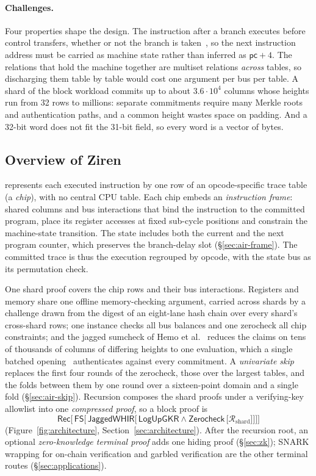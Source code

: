 \paragraph{Challenges.} Four properties shape the design. The instruction after a branch executes before control transfers, whether or not the branch is taken~\citep{mips32-isa}, so the next instruction address must be carried as machine state rather than inferred as $\mathsf{pc}+4$. The relations that hold the machine together are multiset relations \emph{across} tables, so discharging them table by table would cost one argument per bus per table. A shard of the block workload commits up to about $3.6\cdot10^4$ columns whose heights run from 32 rows to millions: separate commitments require many Merkle roots and authentication paths, and a common height wastes space on padding. And a 32-bit word does not fit the 31-bit field, so every word is a vector of bytes.

\subsection{Overview of Ziren}
\label{sec:intro-approach}

\Ziren{} represents each executed instruction by one row of an opcode-specific trace table (a \emph{chip}), with no central CPU table. Each chip embeds an \emph{instruction frame}: shared columns and bus interactions that bind the instruction to the committed program, place its register accesses at fixed sub-cycle positions and constrain the machine-state transition. The state includes both the current and the next program counter, which preserves the branch-delay slot (\S\ref{sec:air-frame}). The committed trace is thus the execution regrouped by opcode, with the state bus as its permutation check.

One shard proof covers the chip rows and their bus interactions. Registers and memory share one offline memory-checking argument, carried across shards by a \LogUp{} challenge drawn from the digest of an eight-lane hash chain over every shard's cross-shard rows; one \LogUp{} instance checks all bus balances and one zerocheck all chip constraints; and the jagged sumcheck of Hemo et al.~\citep{jagged-pcs} reduces the claims on tens of thousands of columns of differing heights to one evaluation, which a single batched \WHIR{} opening~\citep{whir} authenticates against every commitment. A \emph{univariate skip} replaces the first four rounds of the zerocheck, those over the largest tables, and the folds between them by one round over a sixteen-point domain and a single fold (\S\ref{sec:air-skip}). Recursion composes the shard proofs under a verifying-key allowlist into one \emph{compressed proof}, so a block proof is
\[
  \mathsf{Rec}\Big[\,\mathsf{FS}\big[\,\mathsf{JaggedWHIR}\big[\,\mathsf{LogUpGKR} \wedge \mathsf{Zerocheck}\,\big[\mathcal R_{\mathrm{shard}}\big]\big]\big]\Big]
\]
(Figure~\ref{fig:architecture}, Section~\ref{sec:architecture}). After the recursion root, an optional \emph{zero-knowledge terminal proof} adds one hiding proof (\S\ref{sec:zk}); SNARK wrapping for on-chain verification and garbled verification are the other terminal routes (\S\ref{sec:applications}).

